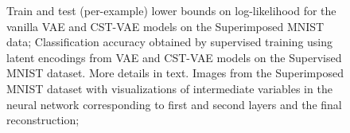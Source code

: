 \begin{figure}[t]
\begin{center}
\;
\;
\vspace{-4mm}
\end{center}
 \caption{\footnotesize
  Train and test (per-example) lower bounds on log-likelihood 
for the vanilla VAE and CST-VAE models on the Superimposed MNIST data;
 Classification accuracy obtained by supervised training using latent encodings
 from VAE and CST-VAE models on the Supervised MNIST dataset.  More details in text.
   Images from the Superimposed MNIST dataset with visualizations of
 intermediate variables in the neural network corresponding to first and second layers and the final reconstruction;
 }
\end{figure}





